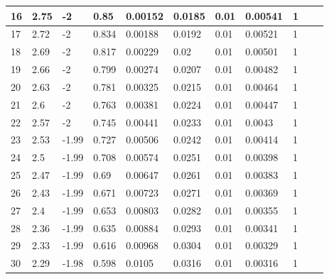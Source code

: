 \begin{table}[ht]
\begin{tabular}{|l|l|l|l|l|l|l|l|l|l|l|}
		16 & 2.75 & -2             & 0.85  & 0.00152  & 0.0185   & 0.01     & 0.00541  & 1              \\ \hline
		17 & 2.72 & -2             & 0.834 & 0.00188  & 0.0192   & 0.01     & 0.00521  & 1              \\ \hline
		18 & 2.69 & -2             & 0.817 & 0.00229  & 0.02     & 0.01     & 0.00501  & 1              \\ \hline
		19 & 2.66 & -2             & 0.799 & 0.00274  & 0.0207   & 0.01     & 0.00482  & 1              \\ \hline
		20 & 2.63 & -2             & 0.781 & 0.00325  & 0.0215   & 0.01     & 0.00464  & 1              \\ \hline
		21 & 2.6  & -2             & 0.763 & 0.00381  & 0.0224   & 0.01     & 0.00447  & 1              \\ \hline
		22 & 2.57 & -2             & 0.745 & 0.00441  & 0.0233   & 0.01     & 0.0043   & 1              \\ \hline
		23 & 2.53 & -1.99          & 0.727 & 0.00506  & 0.0242   & 0.01     & 0.00414  & 1              \\ \hline
		24 & 2.5  & -1.99          & 0.708 & 0.00574  & 0.0251   & 0.01     & 0.00398  & 1              \\ \hline
		25 & 2.47 & -1.99          & 0.69  & 0.00647  & 0.0261   & 0.01     & 0.00383  & 1              \\ \hline
		26 & 2.43 & -1.99          & 0.671 & 0.00723  & 0.0271   & 0.01     & 0.00369  & 1              \\ \hline
		27 & 2.4  & -1.99          & 0.653 & 0.00803  & 0.0282   & 0.01     & 0.00355  & 1              \\ \hline
		28 & 2.36 & -1.99          & 0.635 & 0.00884  & 0.0293   & 0.01     & 0.00341  & 1              \\ \hline
		29 & 2.33 & -1.99          & 0.616 & 0.00968  & 0.0304   & 0.01     & 0.00329  & 1              \\ \hline
		30 & 2.29 & -1.98          & 0.598 & 0.0105   & 0.0316   & 0.01     & 0.00316  & 1              \\ \hline
	\end{tabular}
\end{table}